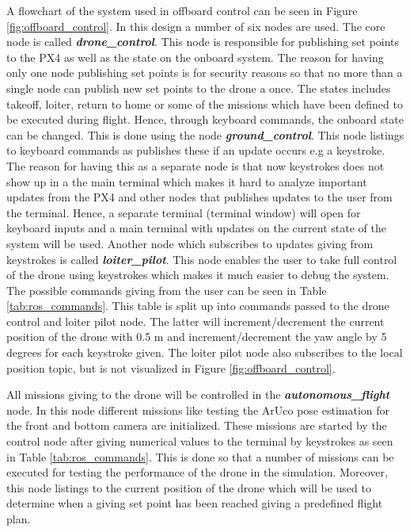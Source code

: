 \documentclass[../Head/report.tex]{subfiles}
\begin{document}
A flowchart of the system used in offboard control can be seen in Figure \ref{fig:offboard_control}. In this design a number of six nodes are used. The core node is called \textit{\textbf{drone\_control}}. This node is responsible for publishing set points to the PX4 as well as the state on the onboard system. The reason for having only one node publishing set points is for security reasons so that no more than a single node can publish new set points to the drone a once. The states includes takeoff, loiter, return to home or some of the missions which have been defined to be executed during flight. Hence, through keyboard commands, the onboard state can be changed. This is done using the node \textit{\textbf{ground\_control}}. This node listings to keyboard commands as publishes these if an update occurs e.g a keystroke. The reason for having this as a separate node is that now keystrokes does not show up in a the main terminal which makes it hard to analyze important updates from the PX4 and other nodes that publishes updates to the user from the terminal. Hence, a separate terminal (terminal window) will open for keyboard inputs and a main terminal with updates on the current state of the system will be used. Another node which subscribes to updates giving from keystrokes is called  \textit{\textbf{loiter\_pilot}}. This node enables the user to take full control of the drone using keystrokes which makes it much easier to debug the system. The possible commands giving from the user can be seen in Table \ref{tab:ros_commands}. This table is split up into commands passed to the drone control and loiter pilot node. The latter will increment/decrement the current position of the drone with 0.5 m and increment/decrement the yaw angle by 5 degrees for each keystroke given. The loiter pilot node also subscribes to the local position topic, but is not visualized in Figure \ref{fig:offboard_control}.

All missions giving to the drone will be controlled in the \textit{\textbf{autonomous\_flight}} node. In this node different missions like testing the ArUco pose estimation for the front and bottom camera are initialized. These missions are started by the control node after giving numerical values to the terminal by keystrokes as seen in Table  \ref{tab:ros_commands}. This is done so that a number of missions can be executed for testing the performance of the drone in the simulation. Moreover, this node listings to the current position of the drone which will be used to determine when a giving set point has been reached giving a predefined flight plan. 
\end{document}
